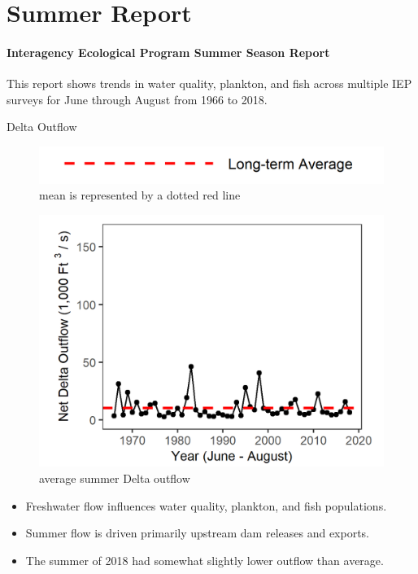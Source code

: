\documentclass[
]{book}
\providecommand{\tightlist}{%
  \setlength{\itemsep}{0pt}\setlength{\parskip}{0pt}}
\begin{document}
\hypertarget{Summer}{%
\chapter{Summer Report}\label{Summer}}

\hypertarget{interagency-ecological-program-summer-season-report}{%
\subsubsection{Interagency Ecological Program Summer Season Report}\label{interagency-ecological-program-summer-season-report}}

This report shows trends in water quality, plankton, and fish across multiple IEP
surveys for June through August from 1966 to 2018.

Delta Outflow

\begin{figure}
\includegraphics[width=15.25in]{figures/mline} \caption{mean is represented by a dotted red line}\label{fig:unnamed-chunk-47}
\end{figure}

\begin{figure}
\includegraphics[width=15.25in]{figures/summer_outflow_update} \caption{average summer Delta outflow}\label{fig:unnamed-chunk-48}
\end{figure}

\begin{itemize}
\tightlist
\item
  Freshwater flow influences water quality, plankton, and fish populations.
\item
  Summer flow is driven primarily upstream dam releases and exports.
\item
  The summer of 2018 had somewhat slightly lower outflow than average.
\end{itemize}
\end{document}
